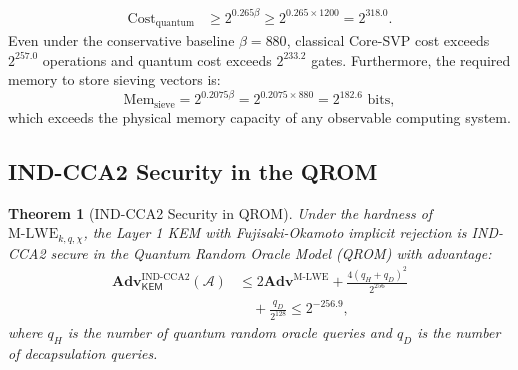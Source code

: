 \documentclass{ieeeaccess}
\newcommand{\Adv}{\mathbf{Adv}}
\newcommand{\calA}{\mathcal{A}}
\newtheorem{theorem}{Theorem}
\newenvironment{proof}{\begin{IEEEproof}\IEEEQEDoff}{\end{IEEEproof}}
\begin{document}
\begin{proof}
\begin{equation}
\begin{aligned}
  \mathrm{Cost}_{\mathrm{quantum}}   &\ge 2^{0.265 \beta} \ge 2^{0.265 \times 1200} = 2^{318.0}.
\end{aligned}
\end{equation}
Even under the conservative baseline $\beta = 880$, classical Core-SVP cost exceeds $2^{257.0}$ operations and quantum cost exceeds $2^{233.2}$ gates.
Furthermore, the required memory to store sieving vectors is:
\begin{equation}
  \mathrm{Mem}_{\mathrm{sieve}} = 2^{0.2075 \beta} = 2^{0.2075 \times 880} = 2^{182.6} \text{ bits},
\end{equation}
which exceeds the physical memory capacity of any observable computing system.
\end{proof}

\subsection{IND-CCA2 Security in the QROM}
\begin{theorem}[IND-CCA2 Security in QROM]
\label{thm:L1-cca}
Under the hardness of $\mathrm{M\text{-}LWE}_{k,q,\chi}$, the Layer 1 KEM with Fujisaki-Okamoto implicit rejection is IND-CCA2 secure in the Quantum Random Oracle Model (QROM) with advantage:
\begin{equation}
\begin{aligned}
  \Adv_{\mathsf{KEM}}^{\mathrm{IND\text{-}CCA2}}(\calA)
  &\leq 2 \Adv^{\mathrm{M\text{-}LWE}} + \frac{4 (q_H + q_D)^2}{2^{256}} \\
  &\quad + \frac{q_D}{2^{128}} \leq 2^{-256.9},
\end{aligned}
\end{equation}
where $q_H$ is the number of quantum random oracle queries and $q_D$ is the number of decapsulation queries.
\end{theorem}
\end{document}
